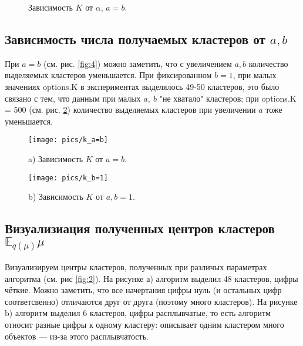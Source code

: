 \documentclass[twoside]{article}
\begin{document}
\begin{figure}[h!]
	\begin{center}
	\begin{minipage}[h]{0.49\linewidth}
	\end{minipage}
	\caption{Зависимость $K$ от $\alpha$, $a = b$.}
	\label{fig:3}
	\end{center}
\end{figure}

\subsection{Зависимость числа получаемых кластеров от $a, b$}
При $a = b$ (см. рис. \ref{fig:4}) можно заметить, что с увеличением $a, b$ количество выделяемых кластеров уменьшается. При фиксированном $b = 1$, при малых значениях options.K в экспериментах  выделялось 49-50 кластеров, это было связано с тем, что данным при малых $a,\:b$ "не хватало" кластеров; при options.K = 500 (см. рис. \ref{fig:5}) количество выделяемых кластеров при увеличении $a$ тоже уменьшается.
\begin{figure}[h!]
	\begin{center}
		\begin{minipage}[h]{0.49\linewidth}
			\texttt{[image: pics/k\_a=b]} 
			\caption{a) Зависимость $K$ от  $a = b$.}
			\label{fig:4}
		\end{minipage}
		\hfill
		\begin{minipage}[h]{0.48\linewidth}
			\texttt{[image: pics/k\_b=1]}
			\caption{b) Зависимость $K$ от $a, b = 1$.}
			\label{fig:5}
		\end{minipage}
	\end{center}
\end{figure}

\subsection{Визуализиация полученных центров кластеров $\mathbb{E}_{q(\mu)}\mu$}
Визуализируем центры кластеров, полученных при различых параметрах алгоритма (см. рис \ref{fig:2}). На рисунке а) алгоритм выделил 48 кластеров, цифры чёткие. Можно заметить, что все начертания цифры нуль (и остальных цифр соответсвенно) отличаются друг от друга (поэтому много кластеров). На рисунке b) алгоритм выделил 6 кластеров, цифры расплывчатые, то есть алгоритм относит разные цифры к одному кластеру: описывает одним кластером много объектов --- из-за этого расплывчатость.
\end{document}
